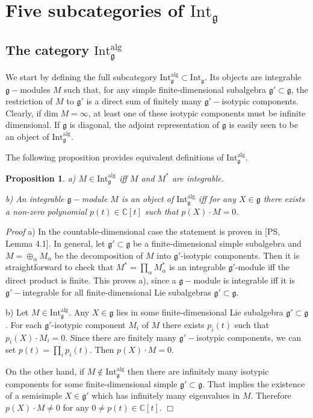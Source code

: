 \documentclass{svmult}
\newtheorem{prop}[theo]{Proposition}
\renewenvironment{proof}{ \emph{Proof}}{$\Box$}
\newcommand {\CC} {\mathbb {C}}
\renewcommand{\gg}{\mathfrak{g}}
\newcommand{\alg}{\mathrm{alg}}
\begin{document}
\vspace*{0.5cm}
\section{Five subcategories of $\mathrm{Int}_{\gg}$}\label{sect:3}

\subsection{The category $\mathrm{Int}_{\gg}^\alg$}\label{sect:3.1}
We start by defining the full subcategory $\mathrm{Int}_{\gg}^\alg \subset \mathrm{Int}_{\gg}$. Its objects are integrable $\gg-$modules $M$ such that, for any simple finite-dimensional subalgebra $\gg'\subset\gg$, the restriction of $M$ to $\gg'$ is a direct sum of finitely many $\gg'-$isotypic components. Clearly, if $\mathrm{dim}\;M=\infty$, at least one of these isotypic components must be infinite dimensional. If $\gg$ is diagonal, the adjoint representation of $\gg$ is easily seen to be an object of $\mathrm{Int}_{\gg}^\alg$.  

The following proposition provides equivalent definitions of $\mathrm{Int}_{\gg}^\alg$. 

\begin{prop}\label{alg1} a) $M\in\mathrm{Int}_{\gg}^\alg$ iff $M$ and $M^*$ are integrable.

b) An integrable $\gg-$module $M$ is an object of $\mathrm{Int}_{\gg}^\alg$ iff for any $X\in\gg$ there exists a non-zero polynomial $p(t)\in\CC[t]$ such that $p(X)\cdot M=0$.
\end{prop}
\begin{proof} a) In the countable-dimensional case the statement is proven in [PS, Lemma 4.1].
In general, let $\gg'\subset\gg$ be a finite-dimensional simple subalgebra and $M=\oplus_\alpha M_\alpha$ be the decomposition of $M$ into $\gg'$-isotypic components. Then it is straightforward to check that $M^*=\prod_\alpha M_\alpha^*$ is an integrable $\gg'$-module iff the direct product is finite. This proves a), since a $\gg-$module is integrable iff it is $\gg'-$integrable for all finite-dimensional Lie subalgebras $\gg' \subset \gg$.

b) Let $M\in \mathrm{Int}_{\gg}^\alg$. Any $X\in\gg$ lies in some finite-dimensional Lie subalgebra $\gg' \subset \gg$. For each $\gg'$-isotypic component $M_i$ of $M$ there exists $p_i(t)$ such that $p_i(X) \cdot M_i = 0$. Since there are finitely many $\gg'-$isotypic components, we can set $p(t)=\prod_i p_i(t)$. Then $p(X) \cdot M = 0$. 

On the other hand, if $M\notin  \mathrm{Int}_{\gg}^\alg$ then there are infinitely many isotypic components for some finite-dimensional simple $\gg'\subset\gg$. That implies the existence of a semisimple $X\in \gg'$ which has infinitely many eigenvalues in $M$. Therefore $p(X) \cdot M \neq 0$ for any $0 \neq p(t) \in \CC[t]$. 
\end{proof}
\end{document}
